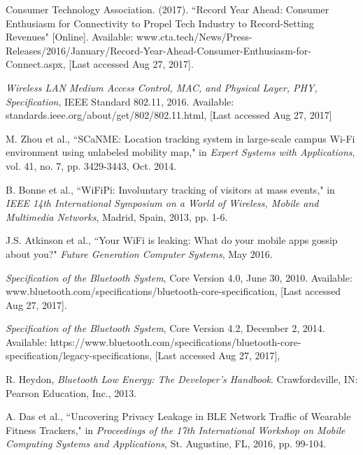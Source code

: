 \documentclass[conference]{./IEEEtran/IEEEtran}
\begin{document}
%	
%	 
\begin{thebibliography}{1}
	
	Consumer Technology Association. (2017). ``Record Year Ahead: Consumer Enthusiasm for Connectivity to Propel Tech Industry to Record-Setting Revenues" [Online]. Available: www.cta.tech/News/Press-Releases/2016/January/Record-Year-Ahead-Consumer-Enthusiasm-for-Connect.aspx, [Last accessed Aug 27, 2017].
	
	{\em Wireless LAN Medium Access Control, MAC, and Physical Layer, PHY, Specification}, IEEE Standard 802.11, 2016. Available: standards.ieee.org/about/get/802/802.11.html, [Last accessed Aug 27, 2017]
	
	M. Zhou et al., ``SCaNME: Location tracking system in large-scale campus Wi-Fi environment using unlabeled mobility map," in {\em Expert Systems with Applications}, vol. 41, no. 7, pp. 3429-3443, Oct. 2014.
	
	B. Bonne et al., ``WiFiPi: Involuntary tracking of visitors at mass events," in {\em IEEE 14th International Symposium on a World of Wireless, Mobile and Multimedia Networks}, Madrid, Spain, 2013, pp. 1-6.
	
	J.S. Atkinson et al., ``Your WiFi is leaking: What do your mobile apps gossip about you?" {\em Future Generation Computer Systems}, May 2016.
	
	{\em Specification of the Bluetooth System}, Core Version 4.0, June 30, 2010. Available: www.bluetooth.com/specifications/bluetooth-core-specification, [Last accessed Aug 27, 2017].
	
	{\em Specification of the Bluetooth System}, Core Version 4.2, December 2, 2014. Available: https://www.bluetooth.com/specifications/bluetooth-core-specification/legacy-specifications, [Last accessed Aug 27, 2017],
	
	R. Heydon, {\em Bluetooth Low Energy: The Developer's Handbook}. Crawfordsville, IN: Pearson Education, Inc., 2013.
	
	A. Das et al., ``Uncovering Privacy Leakage in BLE Network Traffic of Wearable Fitness Trackers," in {\em Proceedings of the 17th International Workshop on Mobile Computing Systems and Applications}, St. Augustine, FL, 2016, pp. 99-104.
	

\end{thebibliography}
\end{document}
